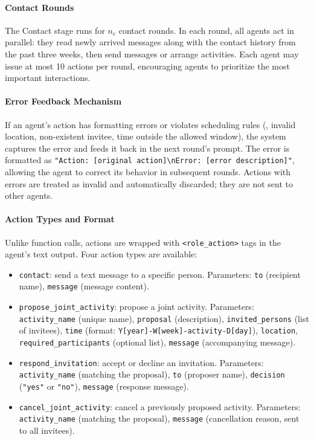 \paragraph{Contact Rounds}
The Contact stage runs for $n_c$ contact rounds.
In each round, all agents act in parallel: they read newly arrived messages along with the contact history from the past three weeks, then send messages or arrange activities.
Each agent may issue at most 10 actions per round, encouraging agents to prioritize the most important interactions.

\paragraph{Error Feedback Mechanism}
If an agent's action has formatting errors or violates scheduling rules (\eg, invalid location, non-existent invitee, time outside the allowed window), the system captures the error and feeds it back in the next round's prompt.
The error is formatted as \texttt{"Action: [original action]\textbackslash nError: [error description]"}, allowing the agent to correct its behavior in subsequent rounds.
Actions with errors are treated as invalid and automatically discarded; they are not sent to other agents.

\paragraph{Action Types and Format}
Unlike function calls, actions are wrapped with \texttt{<role\_action>} tags in the agent's text output.
Four action types are available:

\begin{itemize}[nosep]
\item \texttt{contact}: send a text message to a specific person. Parameters: \texttt{to} (recipient name), \texttt{message} (message content).
\item \texttt{propose\_joint\_activity}: propose a joint activity. Parameters: \texttt{activity\_name} (unique name), \texttt{proposal} (description), \texttt{invited\_persons} (list of invitees), \texttt{time} (format: \texttt{Y[year]-\allowbreak W[week]\allowbreak -activity-D[day]}), \texttt{location}, \texttt{required\_participants} (optional list), \texttt{message} (accompanying message).
\item \texttt{respond\_invitation}: accept or decline an invitation. Parameters: \texttt{activity\_name} (matching the proposal), \texttt{to} (proposer name), \texttt{decision} (\texttt{"yes"} or \texttt{"no"}), \texttt{message} (response message).
\item \texttt{cancel\_joint\_activity}: cancel a previously proposed activity. Parameters: \texttt{activity\_name} (matching the proposal), \texttt{message} (cancellation reason, sent to all invitees).
\end{itemize}

